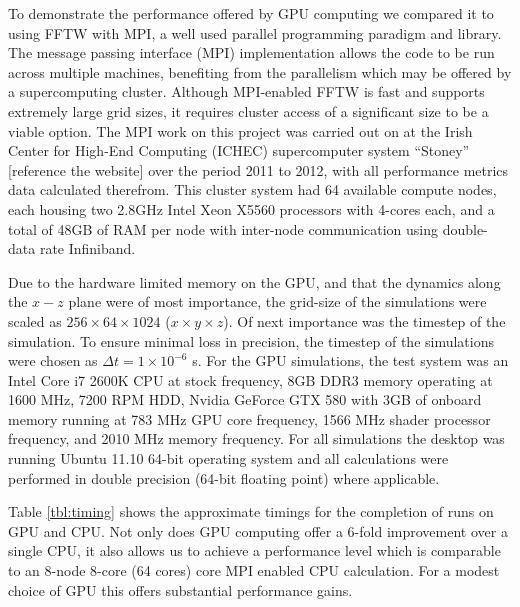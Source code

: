 To demonstrate the performance offered by GPU computing we compared it to using FFTW with MPI, a well used parallel programming paradigm and library. The message passing interface (MPI) implementation allows the code to be run across multiple machines, benefiting from the parallelism which may be offered by a supercomputing cluster. Although MPI-enabled FFTW is fast and supports extremely large grid sizes, it requires cluster access of a significant size to be a viable option. The MPI work on this project was carried out on at the Irish Center for High-End Computing (ICHEC) supercomputer system ``Stoney'' [reference the website] over the period 2011 to 2012, with all performance metrics data calculated therefrom. This cluster system had 64 available compute nodes, each housing two 2.8GHz Intel Xeon X5560 processors with 4-cores each, and a total of 48GB of RAM per node with inter-node communication using double-data rate Infiniband.



Due to the hardware limited memory on the GPU, and that the dynamics along the $x-z$ plane were of most importance, the grid-size of the simulations were scaled as $256\times 64\times1024$ ($x\times y\times z$). Of next importance was the timestep of the simulation.  To ensure minimal loss in precision, the timestep of the simulations were chosen as $\Delta t = 1\times 10^{-6}$ s. For the GPU simulations, the test system was an Intel Core i7 2600K CPU at stock frequency, 8GB DDR3 memory operating at 1600 MHz, 7200 RPM HDD, Nvidia GeForce GTX 580 with 3GB of onboard memory running at 783 MHz GPU core frequency, 1566 MHz shader processor frequency, and 2010 MHz memory frequency. For all simulations the desktop was running Ubuntu 11.10 64-bit operating system and all calculations were performed in double precision (64-bit floating point) where applicable.

Table \ref{tbl:timing} shows the approximate timings for the completion of runs on GPU and CPU. Not only does GPU computing offer a 6-fold improvement over a single CPU, it also allows us to achieve a performance level which is comparable to an 8-node 8-core (64 cores) core MPI enabled CPU calculation. For a modest choice of GPU this offers substantial performance gains.

